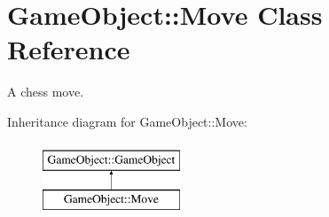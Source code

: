 \hypertarget{classGameObject_1_1Move}{
\section{GameObject::Move Class Reference}
\label{classGameObject_1_1Move}
}


A chess move.  


Inheritance diagram for GameObject::Move:\begin{figure}[H]
\begin{center}
\leavevmode
\includegraphics[height=2.000000cm]{classGameObject_1_1Move}
\end{center}
\end{figure}
